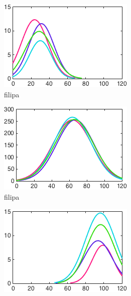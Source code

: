 \begin{figure}[h]
        \centering
        \begin{subfigure}[h]{0.32\textwidth}
                \includegraphics[width=\textwidth]{./img/5/FGHIhard}
                \caption{filipa}
                \label{fig:FGHIhard}
        \end{subfigure}
        \begin{subfigure}[h]{0.32\textwidth}
                \includegraphics[width=\textwidth]{./img/5/FGHImedium}
                \caption{filipa}
                \label{fig:FGHImedium}
        \end{subfigure}
        \begin{subfigure}[h]{0.32\textwidth}
                \includegraphics[width=\textwidth]{./img/5/FGHIeasy}

\end{subfigure}
\end{figure}
